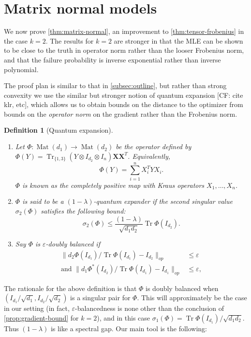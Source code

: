 \documentclass{article}
\newtheorem{definition}{Definition}
\newcommand{\ot}{\otimes}
\newcommand{\mat}{\operatorname{Mat}}
\renewcommand{\vec}{\bm}
\newcommand\eps{\varepsilon}
\newcommand\tr{\operatorname{Tr}}
\newcommand{\CF}[1]{{\color{purple}[CF: #1]}}
\begin{document}
\section{Matrix normal models}\label{sec:matrix-normal}
We now prove \cref{thm:matrix-normal}, an improvement to \cref{thm:tensor-frobenius} in the case $k=2$. The results for $k = 2$ are stronger in that the MLE can be shown to be close to the truth in operator norm rather than the looser Frobenius norm, and that the failure probability is inverse exponential rather than inverse polynomial.




The proof plan is similar to that in \cref{subsec:outline}, but rather than strong convexity we use the similar but stronger notion of quantum expansion \CF{cite klr, etc}, which allows us to obtain bounds on the distance to the optimizer from bounds on the \emph{operator norm} on the gradient rather than the Frobenius norm.

\begin{definition}[Quantum expansion]
$ $
\begin{enumerate}
\item Let $\Phi:\mat(d_1) \to \mat(d_2)$ be the operator defined by $\Phi(Y) = \tr_{\{1,3\}} ( Y \ot I_{d_2} \ot I_{n}) \vec X \vec X^T$. Equivalently,
$$\Phi(Y) = \sum_{i = 1}^n X_i^T Y X_i.$$
$\Phi$ is known as the \emph{completely positive map} with Kraus operators $X_1, \dots, X_n$.
\item $\Phi$ is said to be a \emph{$(1 - \lambda)$-quantum expander} if the second singular value $\sigma_2(\Phi)$ satisfies the following bound:
$$\sigma_2(\Phi) \leq \frac{(1 - \lambda)}{\sqrt{d_1d_2}} \tr \Phi(I_{d_2}).$$
\item Say $\Phi$ is \emph{$\eps$-doubly balanced} if
\begin{align*}
\|d_2 \Phi(I_{d_1})/\tr \Phi(I_{d_1})  - I_{d_2} \|_{op}& \leq \eps\\
\textrm{and }\|d_1 \Phi^*(I_{d_2})/\tr \Phi(I_{d_1})  - I_{d_1}  \|_{op} & \leq \eps,
\end{align*}
\end{enumerate}
\end{definition}

The rationale for the above definition is that $\Phi$ is doubly balanced when $(I_{d_1}/\sqrt{d_1}, I_{d_2}/\sqrt{d_2})$ is a singular pair for $\Phi$. This will approximately be the case in our setting (in fact, $\eps$-balancedness is none other than the conclusion of \cref{prop:gradient-bound} for $k = 2$), and in this case $\sigma_1(\Phi) =  \tr \Phi(I_{d_1})/\sqrt{d_1 d_2}.$ Thus $(1-\lambda)$ is like a spectral gap.
Our main tool is the following:
\end{document}
